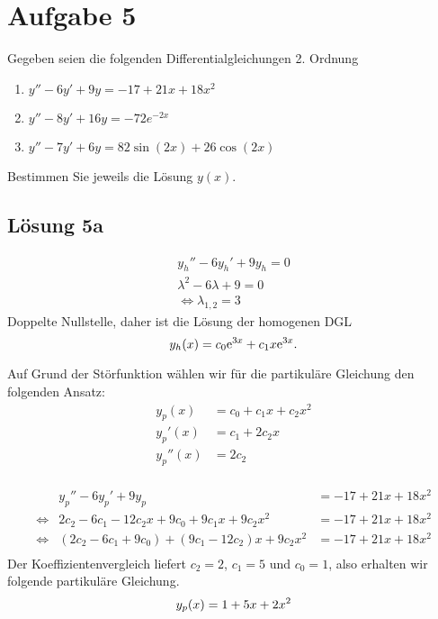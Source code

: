 \documentclass[main.tex]{subfiles}
\begin{document}
\section{Aufgabe 5}
Gegeben seien die folgenden Differentialgleichungen 2. Ordnung
\begin{enumerate}
    \item $y'' - 6y' + 9y = -17 + 21x + 18x^2$
    \item $y'' - 8y' + 16y = -72e^{-2x}$
    \item $y'' - 7y' + 6y = 82\sin(2x) + 26\cos(2x)$
\end{enumerate}
Bestimmen Sie jeweils die Lösung $y(x)$.

\subsection{Lösung 5a}
\begin{align*}
    y_h'' - 6y_h' + 9y_h = 0 \\[5mm]
    \lambda^2 -6 \lambda + 9 = 0 \\
    \Leftrightarrow \lambda_{1,2} = 3
\end{align*}
Doppelte Nullstelle, daher ist die Lösung der homogenen DGL
$$
    y_h(x) = c_0 \mathrm{e}^{3x} + c_1 x \mathrm{e}^{3x}. \\
$$

Auf Grund der Störfunktion wählen wir für die partikuläre Gleichung den folgenden Ansatz:
\begin{align*}
    y_p(x)   &= c_0 + c_1 x + c_2 x^2\\
    y_p'(x)  &= c_1 + 2 c_2 x\\
    y_p''(x) &= 2 c_2\\
\end{align*}

\begin{equation*}
\begin{array}{rll}
                & y_p'' - 6y_p' + 9y_p &= -17 + 21x + 18x^2 \\
\Leftrightarrow & 2 c_2 - 6c_1 - 12 c_2 x + 9c_0 + 9c_1 x + 9c_2 x^2 &= -17 + 21x + 18x^2\\
\Leftrightarrow & \left(2 c_2 - 6c_1 + 9c_0\right)
    + \left(9c_1 - 12 c_2\right) x 
    + 9c_2 x^2 &= -17 + 21x + 18x^2\\
\end{array}
\end{equation*}
Der Koeffizientenvergleich liefert $c_2 =2$, $c_1 = 5$ und 
$c_0 = 1$, also erhalten wir folgende partikuläre Gleichung.
$$
    y_p(x) = 1 + 5x + 2x^2\\
$$
\end{document}
